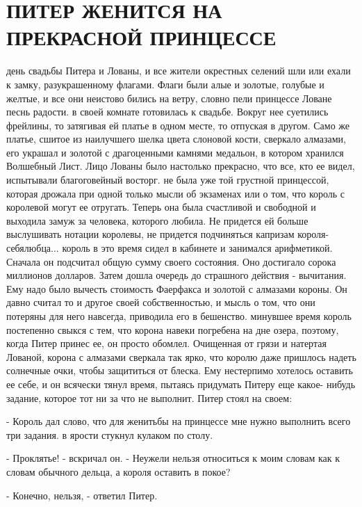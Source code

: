 \chapter{ПИТЕР ЖЕНИТСЯ НА ПРЕКРАСНОЙ ПРИНЦЕССЕ}
\par{} день свадьбы Питера и Лованы, и все жители окрестных 
селений шли или ехали к замку, разукрашенному флагами. Флаги были алые 
и золотые, голубые и желтые, и все они неистово бились на ветру, 
словно пели принцессе Ловане песнь радости.
 в своей комнате готовилась к свадьбе. Вокруг нее суетились 
фрейлины, то затягивая ей платье в одном месте, то отпуская в другом. 
Само же платье, сшитое из наилучшего шелка цвета слоновой кости, 
сверкало алмазами, его украшал и золотой с драгоценными камнями 
медальон, в котором хранился Волшебный Лист. Лицо Лованы было 
настолько прекрасно, что все, кто ее видел, испытывали благоговейный 
восторг.
 не была уже той грустной принцессой, которая дрожала при 
одной только мысли об экзаменах или о том, что король с королевой 
могут ее отругать. Теперь она была счастливой и свободной и выходила 
замуж за человека, которого любила. Не придется ей больше выслушивать 
нотации королевы, не придется подчиняться капризам короля-себялюбца...
 король в это время сидел в кабинете и занимался арифметикой. 
Сначала он подсчитал общую сумму своего состояния. Оно достигало 
сорока миллионов долларов. Затем дошла очередь до страшного действия - 
вычитания. Ему надо было вычесть стоимость Фаерфакса и золотой с 
алмазами короны. Он давно считал то и другое своей собственностью, и 
мысль о том, что они потеряны для него навсегда, приводила его в 
бешенство.
 минувшее время король постепенно свыкся с тем, что корона 
навеки погребена на дне озера, поэтому, когда Питер принес ее, он 
просто обомлел. Очищенная от грязи и натертая Лованой, корона с 
алмазами сверкала так ярко, что королю даже пришлось надеть солнечные 
очки, чтобы защититься от блеска. Ему нестерпимо хотелось оставить ее 
себе, и он всячески тянул время, пытаясь придумать Питеру еще какое-
нибудь задание, которое тот ни за что не выполнит.
 Питер стоял на своем:
\par- Король дал слово, что для женитьбы на принцессе мне нужно 
выполнить всего три задания.
 в ярости стукнул кулаком по столу.
\par- Проклятье! - вскричал он. - Неужели нельзя относиться к моим 
словам как к словам обычного дельца, а короля оставить в покое?
\par- Конечно, нельзя, - ответил Питер.
